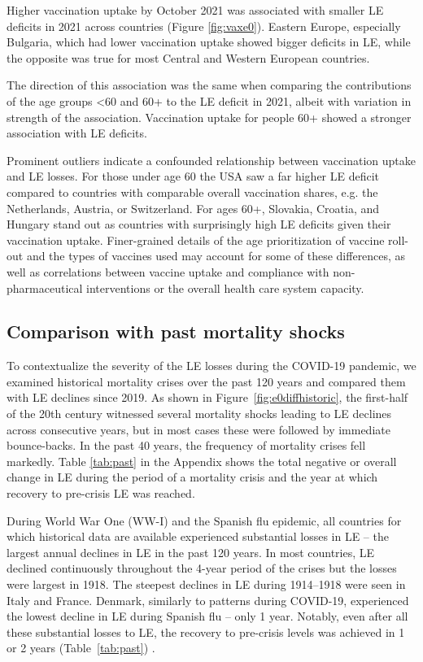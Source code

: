 \documentclass[12pt]{article}
\begin{document}
Higher vaccination uptake by October 2021 was associated with smaller LE deficits in 2021 across countries (Figure \ref{fig:vaxe0}). Eastern Europe, especially Bulgaria, which had lower vaccination uptake showed bigger deficits in LE, while the opposite was true for most Central and Western European countries.

The direction of this association was the same when comparing the contributions of the age groups <60 and 60+ to the LE deficit in 2021, albeit with variation in strength of the association. Vaccination uptake for people 60+ showed a stronger association with LE deficits.

Prominent outliers indicate a confounded relationship between vaccination uptake and LE losses. For those under age 60 the USA saw a far higher LE deficit compared to countries with comparable overall vaccination shares, e.g. the Netherlands, Austria, or Switzerland. For ages 60+, Slovakia, Croatia, and Hungary stand out as countries with surprisingly high LE deficits given their vaccination uptake. Finer-grained details of the age prioritization of vaccine roll-out and the types of vaccines used may account for some of these differences, as well as correlations between vaccine uptake and compliance with non-pharmaceutical interventions or the overall health care system capacity.

\subsection*{Comparison with past mortality shocks}

To contextualize the severity of the LE losses during the COVID-19 pandemic, we examined historical mortality crises over the past 120 years and compared them with LE declines since 2019. As shown in Figure~\ref{fig:e0diffhistoric}, the first-half of the 20th century witnessed several mortality shocks leading to LE declines across consecutive years, but in most cases these were followed by immediate bounce-backs. In the past 40 years, the frequency of mortality crises fell markedly. Table \ref{tab:past} in the Appendix shows the total negative or overall change in LE during the period of a mortality crisis and the year at which recovery to pre-crisis LE was reached.

During World War One (WW-I) and the Spanish flu epidemic, all countries for which historical data are available experienced substantial losses in LE -- the largest annual declines in LE in the past 120 years. In most countries, LE declined continuously throughout the 4-year period of the crises but the losses were largest in 1918. The steepest declines in LE during 1914--1918 were seen in Italy and France. Denmark, similarly to patterns during COVID-19, experienced the lowest decline in LE during Spanish flu -- only 1 year. Notably, even after all these substantial losses to LE, the recovery to pre-crisis levels was achieved in 1 or 2 years (Table~\ref{tab:past}) .
\end{document}
